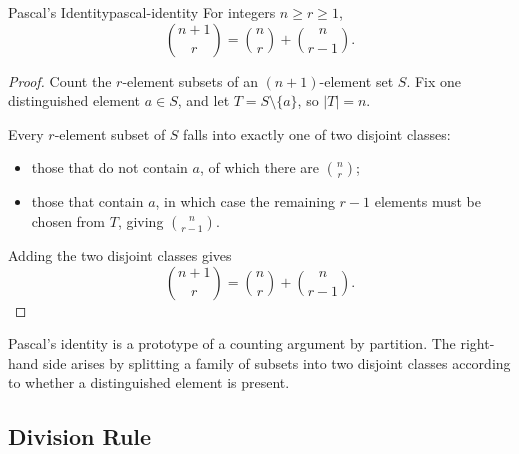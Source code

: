 \begin{theorem}{Pascal's Identity}{pascal-identity}
For integers $n\ge r\ge 1$,
\[
\binom{n+1}{r}=\binom{n}{r}+\binom{n}{r-1}.
\]
\end{theorem}

\begin{proof}
Count the $r$-element subsets of an $(n+1)$-element set $S$. Fix one distinguished element $a\in S$, and let $T=S\setminus\{a\}$, so $|T|=n$.

Every $r$-element subset of $S$ falls into exactly one of two disjoint classes:
\begin{itemize}[leftmargin=*]
    \item those that do not contain $a$, of which there are $\binom{n}{r}$;
    \item those that contain $a$, in which case the remaining $r-1$ elements must be chosen from $T$, giving $\binom{n}{r-1}$.
\end{itemize}
Adding the two disjoint classes gives
\[
\binom{n+1}{r}=\binom{n}{r}+\binom{n}{r-1}.
\]
\end{proof}

\begin{center}
\end{center}

\begin{extension}[title={Structural meaning of Pascal's identity}]
Pascal's identity is a prototype of a counting argument by partition. The right-hand side arises by splitting a family of subsets into two disjoint classes according to whether a distinguished element is present.
\end{extension}

\subsection{Division Rule}


